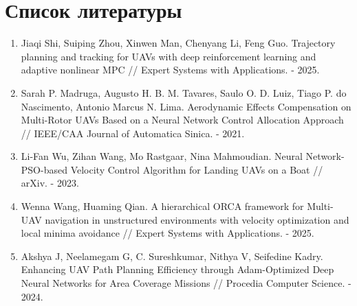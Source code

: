 

\section*{Список литературы}

\begin{enumerate}

    \item Jiaqi Shi, Suiping Zhou, Xinwen Man, Chenyang Li, Feng Guo. Trajectory planning and tracking for UAVs with deep reinforcement learning and adaptive nonlinear MPC //
    Expert Systems with Applications. - 2025.

    \item Sarah P. Madruga, Augusto H. B. M. Tavares, Saulo O. D. Luiz, Tiago P. do Nascimento, Antonio Marcus N. Lima. Aerodynamic Effects Compensation on Multi-Rotor UAVs Based on a Neural Network Control Allocation Approach //
    IEEE/CAA Journal of Automatica Sinica. - 2021.

    \item Li-Fan Wu, Zihan Wang, Mo Rastgaar, Nina Mahmoudian. Neural Network-PSO-based Velocity Control Algorithm for Landing UAVs on a Boat //
    arXiv. - 2023.

    \item Wenna Wang, Huaming Qian. A hierarchical ORCA framework for Multi-UAV navigation in unstructured environments with velocity optimization and local minima avoidance //
    Expert Systems with Applications. - 2025.

    \item Akshya J, Neelamegam G, C. Sureshkumar, Nithya V, Seifedine Kadry. Enhancing UAV Path Planning Efficiency through Adam-Optimized Deep Neural Networks for Area Coverage Missions //
    Procedia Computer Science. - 2024.


\end{enumerate}
